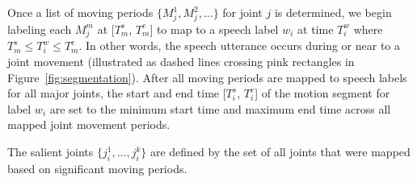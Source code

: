 Once a list of moving periods $\{M_j^1, M_j^2, ...\}$ for joint $j$ is determined, we begin labeling each $M_j^m$ at [$T_{m}^s$, $T_{m}^e$] to map to a speech label $w_i$ at time $T_i^w$ where $T_m^s \leq T_i^w \leq T_m^e$. In other words, the speech utterance occurs during or near to a joint movement (illustrated as dashed lines crossing pink rectangles in Figure~\ref{fig:segmentation}).
%
%
%
%
%
%
After all moving periods are mapped to speech labels for all major joints, the start and end time [$T_i^s$, $T_i^e$] of the motion segment for label $w_i$ are set to the minimum start time and maximum end time across all mapped joint movement periods.

The salient joints $\{j_i^1, ..., j_i^k\}$ are defined by the set of all joints that were mapped based on significant moving periods.

